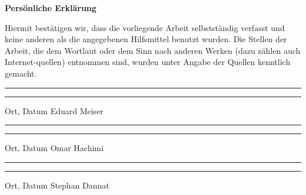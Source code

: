 \textbf{\Large{Persönliche Erklärung}}\vspace{10pt}

Hiermit bestätigen wir, dass die vorliegende Arbeit selbstständig verfasst und keine anderen als die angegebenen Hilfsmittel benutzt wurden. Die Stellen der Arbeit, die dem Wortlaut oder dem Sinn nach anderen Werken (dazu zählen auch Internet-quellen) entnommen sind, wurden unter Angabe der Quellen kenntlich gemacht.

\vspace{50pt}
\noindent\rule{5cm}{.4pt}\hfill\rule{5cm}{.4pt}\par
\noindent Ort, Datum \hfill Eduard Meiser 

\vspace{30pt}
\noindent\rule{5cm}{.4pt}\hfill\rule{5cm}{.4pt}\par
\noindent Ort, Datum \hfill Omar Hachimi 

\vspace{30pt}
\noindent\rule{5cm}{.4pt}\hfill\rule{5cm}{.4pt}\par
\noindent Ort, Datum \hfill Stephan Dannat 